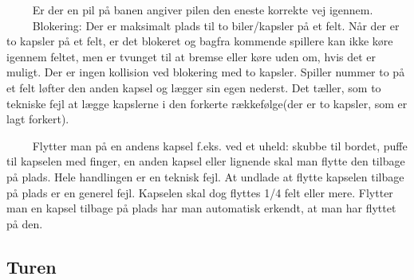 \documentclass[12pt]{article}
\begin{document}
$\qquad$ Er der en pil på banen angiver pilen den eneste korrekte vej igennem.\\

$\qquad$ Blokering: Der er maksimalt plads til to biler/kapsler på et felt. Når der er to kapsler på et felt, er det blokeret og bagfra kommende spillere kan ikke køre igennem feltet, men er tvunget til at bremse eller køre uden om, hvis det er muligt. Der er ingen kollision ved blokering med to kapsler. Spiller nummer to på et felt løfter den anden kapsel og lægger sin egen nederst. Det tæller, som to tekniske fejl at lægge kapslerne i den forkerte rækkefølge(der er to kapsler, som er lagt forkert).

$\qquad$ Flytter man på en andens kapsel f.eks. ved et uheld: skubbe til bordet, puffe til kapselen med finger, en anden kapsel eller lignende skal man flytte den tilbage på plads. Hele handlingen er en teknisk fejl. At undlade at flytte kapselen tilbage på plads er en generel fejl. Kapselen skal dog flyttes 1/4 felt eller mere. Flytter man en kapsel tilbage på plads har man automatisk erkendt, at man har flyttet på den.




\subsection*{Turen}
\end{document}
